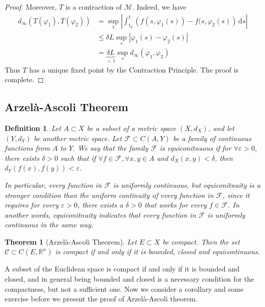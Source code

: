 \documentclass[12pt,leqno]{amsart}
\newtheorem{definition}{Definition}[section]
\newtheorem{theorem}{Theorem}[section]
\theoremstyle{definition}
\numberwithin{equation}{subsection}
\begin{document}
\begin{proof}
Moreover, $T$ is a contraction of $\mathcal{M}$. Indeed, we have 
\begin{align*}
    d_\infty\left(T(\varphi_1), T(\varphi_2)\right) & = \sup_{t} \left|\int^{t}_{t_0} \left(f(s,\varphi_1(s)) - f(s,\varphi_2(s)\right) \, \text{d}s\right|\\
    & \leq \delta L \sup_{s} \left|\varphi_1(s) - \varphi_2(s) \right| \\
    & = \underbrace{\delta L}_{< 1} \sup_{s} d_\infty(\varphi_1, \varphi_2)
\end{align*}
Thus $T$ has a unique fixed point by the Contraction Principle. The proof is complete.
\end{proof}

\medskip

\subsection{Arzelà-Ascoli Theorem}
\begin{definition}
Let $A\subset X$ be a subset of a metric space $(X,d_X)$, and let $(Y,d_Y)$ be another metric space. Let $\mathcal{F}\subset C(A,Y)$ be a family of continuous functions from $A$ to $Y$. We say that the family $\mathcal{F}$ is equiconitnuous if for $\forall\varepsilon > 0$, there exists $\delta > 0$ such that if $\forall f\in\mathcal{F}, \forall x,y\in A$ and $d_X(x,y) < \delta$, then $d_Y(f(x),f(y)) < \varepsilon$.

In particular, every function in $\mathcal{F}$ is uniformly continuous, but equiconitnuity is a stronger condition than the uniform continuity of every function in $\mathcal{F}$, since it requires for every $\varepsilon > 0$, there exists a $\delta > 0$ that works for every $f\in\mathcal{F}$. In another words, equiconitnuity indicates that every function in $\mathcal{F}$ is uniformly continuous in the same way.
\end{definition}

\medskip

\begin{theorem}[Arzelà-Ascoli Theorem]
Let $E\subset X$ be compact. Then the set $\mathcal{C}\subset C(E,\mathbb{R}^n)$ is compact if and only if it is bounded, closed and equicontinuous.
\end{theorem}

\medskip

A subset of the Euclidean space is compact if and only if it is bounded and closed, and in general being bounded and closed is a necessary condition for the compactness, but not a sufficient one. Now we consider a corollary and some exercise before we present the proof of Arzelà-Ascoli theorem.
\end{document}
